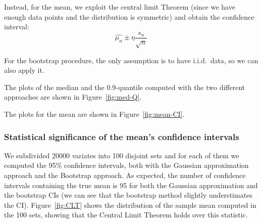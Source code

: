 \documentclass[a4paper]{article}
\begin{document}
Instead, for the mean, we exploit the central limit Theorem (since we
have enough data points and the distribution is symmetric) and obtain
the confidence interval:
\begin{equation*}
  \hat{\mu_n} \pm \eta\frac{s_n}{\sqrt{n}}
\end{equation*}

For the bootstrap procedure, the only assumption is to have
i.i.d.\ data, so we can also apply it.

The plots of the median and the 0.9-quantile computed with the two
different approaches are shown in Figure~\ref{fig:med-Q}.

The plots for the mean are shown in Figure~\ref{fig:mean-CI}.

\subsubsection*{Statistical significance of the mean's confidence intervals}

We subdivided 20000 variates into 100 disjoint sets and for each of
them we computed the 95\% confidence intervals, both with the
Gaussian approximation approach and the Bootstrap approach. As
expected, the number of confidence intervals containing the true mean
is 95 for both the Gaussian approximation and
the bootstrap CIs (we can see that the bootstrap method slightly
understimates the CI).
Figure~\ref{fig:CLT} shows the distribution of the sample mean
computed in the 100 sets, showing that the Central Limit Theorem
holds over this statistic.
\end{document}
